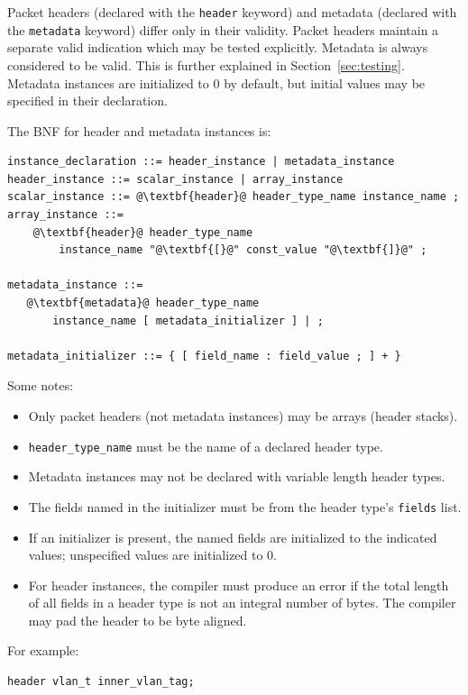 \documentclass[12pt]{article}
\begin{document}
Packet headers (declared with the \texttt{header} keyword) and metadata (declared 
with the \texttt{metadata} keyword) differ only in their validity. Packet headers 
maintain a separate valid indication which may be tested explicitly. Metadata 
is always considered to be valid. This is further explained in 
Section~\ref{sec:testing}.  Metadata instances are 
initialized to 0 by default, but initial values may be specified in their 
declaration.

The BNF for header and metadata instances is:

\begin{lstlisting}[frame=single,backgroundcolor=\color{bnfgreen},escapechar=\@]
instance_declaration ::= header_instance | metadata_instance
header_instance ::= scalar_instance | array_instance
scalar_instance ::= @\textbf{header}@ header_type_name instance_name ;
array_instance ::=
    @\textbf{header}@ header_type_name 
        instance_name "@\textbf{[}@" const_value "@\textbf{]}@" ;

metadata_instance ::= 
   @\textbf{metadata}@ header_type_name
       instance_name [ metadata_initializer ] | ;

metadata_initializer ::= { [ field_name : field_value ; ] + }
\end{lstlisting}


Some notes:

\begin{itemize}
\item
Only packet headers (not metadata instances) may be arrays (header stacks).
\item
\texttt{header_type_name} must be the name of a declared header type.
\item
Metadata instances may not be declared with variable length header types.
\item
The fields named in the initializer must be from the header type's \texttt{fields} list.
\item
If an initializer is present, the named fields are initialized to the indicated 
values; unspecified values are initialized to 0.
\item
For header instances, the compiler must produce an error if the total length 
of all fields in a header type is not an integral number of bytes. The compiler 
may pad the header to be byte aligned.
\end{itemize}


For example:

\begin{lstlisting}[keywords={},frame=single,escapechar=\@]
header vlan_t inner_vlan_tag;
\end{lstlisting}
\end{document}
